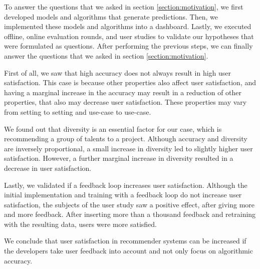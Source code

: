 To answer the questions that we asked in section \ref{section:motivation}, we first developed models and algorithms that generate predictions. Then, we implemented these models and algorithms into a dashboard. Lastly, we executed offline, online evaluation rounds, and user studies to validate our hypotheses that were formulated as questions. After performing the previous steps, we can finally answer the questions that we asked in section \ref{section:motivation}. 

First of all, we saw that high accuracy does not always result in high user satisfaction. This case is because other properties also affect user satisfaction, and having a marginal increase in the accuracy may result in a reduction of other properties, that also may decrease user satisfaction. These properties may vary from setting to setting and use-case to use-case. 

We found out that diversity is an essential factor for our case, which is recommending a group of talents to a project. Although accuracy and diversity are inversely proportional, a small increase in diversity led to slightly higher user satisfaction. However, a further marginal increase in diversity resulted in a decrease in user satisfaction. 

Lastly, we validated if a feedback loop increases user satisfaction. Although the initial implementation and training with a feedback loop do not increase user satisfaction, the subjects of the user study saw a positive effect, after giving more and more feedback. After inserting more than a thousand feedback and retraining with the resulting data, users were more satisfied.

We conclude that user satisfaction in recommender systems can be increased if the developers take user feedback into account and not only focus on algorithmic accuracy.